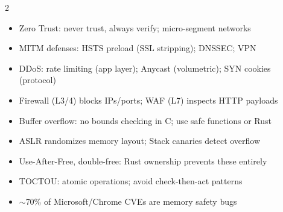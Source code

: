 \documentclass[11pt, letterpaper]{article}
\begin{document}
\begin{tcolorbox}[colback=part4bg, colframe=sectionorange,
  title={\bfseries Network Security \& Low-Level}, arc=3pt, boxrule=1pt]
\footnotesize
\begin{multicols}{2}
\begin{itemize}[noitemsep, leftmargin=*]
  \item Zero Trust: never trust, always verify; micro-segment networks
  \item MITM defenses: HSTS preload (SSL stripping); DNSSEC; VPN
  \item DDoS: rate limiting (app layer); Anycast (volumetric); SYN cookies (protocol)
  \item Firewall (L3/4) blocks IPs/ports; WAF (L7) inspects HTTP payloads
\end{itemize}
\columnbreak
\begin{itemize}[noitemsep, leftmargin=*]
  \item Buffer overflow: no bounds checking in C; use safe functions or Rust
  \item ASLR randomizes memory layout; Stack canaries detect overflow
  \item Use-After-Free, double-free: Rust ownership prevents these entirely
  \item TOCTOU: atomic operations; avoid check-then-act patterns
  \item $\sim$70\% of Microsoft/Chrome CVEs are memory safety bugs
\end{itemize}
\end{multicols}
\end{tcolorbox}

\vspace{4pt}
\end{document}
